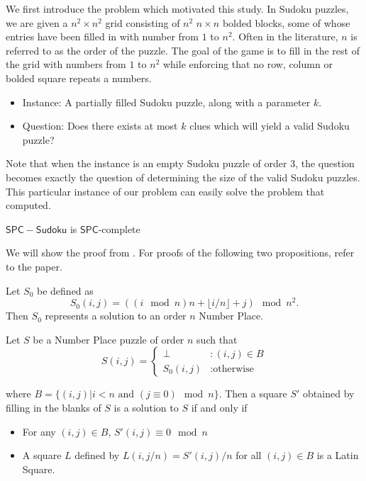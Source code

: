 \documentclass[runningheads,a4paper]{llncs}
\begin{document}
We first introduce the problem which motivated this study. In Sudoku puzzles, we are given a $n^2 \times n^2$ grid consisting of $n^2$ $n \times n$ bolded blocks, some of whose entries have been filled in with number from $1$ to $n^2$. Often in the literature, $n$ is referred to as the order of the puzzle. The goal of the game is to fill in the rest of the grid with numbers from $1$ to $n^2$ while enforcing that no row, column or bolded square repeats a numbers. 

\begin{itemize}
\item Instance: A partially filled Sudoku puzzle, along with a parameter $k$.
\item Question: Does there exists at most $k$ clues which will yield a valid Sudoku puzzle?
\end{itemize}

Note that when the instance is an empty Sudoku puzzle of order 3, the question becomes exactly the question of determining the size of the valid Sudoku puzzles. This particular instance of our problem can easily solve the problem that \cite{mcguire2012there} computed. 

\begin{theorem}
$\mathsf{SPC-Sudoku}$ is $\mathsf{SPC}$-complete
\end{theorem}

We will show the proof from \cite{takayuki2003complexity}. For proofs of the following two propositions, refer to the paper. 

\begin{proposition}
Let $S_0$ be defined as
$$S_0 (i,j) = ((i \mod n) n + \lfloor i/n \rfloor + j) \mod n^2. $$
Then $S_0$ represents a solution to an order $n$ Number Place. 
\end{proposition}

\begin{proposition}
Let $S$ be a Number Place puzzle of order $n$ such that
\begin{displaymath}
S(i,j) = \left\{
\begin{array}{lr}
\perp & : (i,j) \in B\\
S_0 (i,j) & : \text{otherwise}
\end{array}
\right.
\end{displaymath}

where $B = \{ (i,j) | i < n \text{ and } (j \equiv 0) \mod n \}$. Then a square $S'$ obtained by filling in the blanks of $S$ is a solution to $S$ if and only if

\begin{itemize}
\item For any $(i,j) \in B$, $S'(i,j) \equiv 0 \mod n$
\item A square $L$ defined by $L(i, j/n) = S'(i,j)/n$ for all $(i, j) \in B$ is a Latin Square.
\end{itemize}

\end{proposition}
\end{document}
